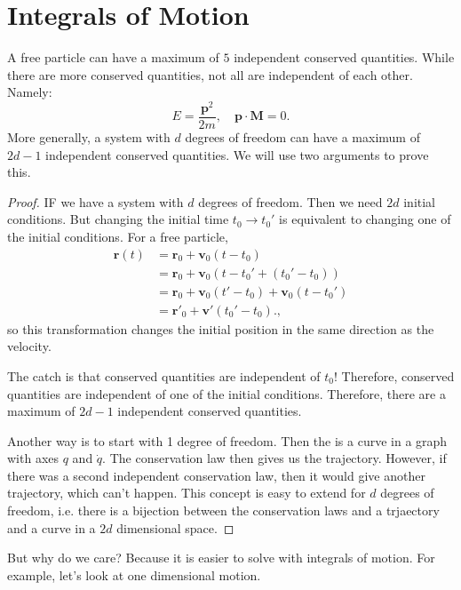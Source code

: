 \documentclass{article}
\numberwithin{equation}{section}
\begin{document}
\section{Integrals of Motion}
A free particle can have a maximum of $5$ independent conserved quantities. While there are more conserved quantities, not all are independent of each other. Namely:
\begin{equation*}
    E = \frac{\bm{p}^2}{2m},\quad \bm{p}\cdot \bm{M} = 0.
\end{equation*}
More generally, a system with $d$ degrees of freedom can have a maximum of $2d-1$ independent conserved quantities. We will use two arguments to prove this.
\begin{proof}
    IF we have a system with $d$ degrees of freedom. Then we need $2d$ initial conditions. But changing the initial time $t_0 \to t_0'$ is equivalent to changing one of the initial conditions. For a free particle,
    \begin{align*}
        \bm{r}(t) &= \bm{r}_0 + \bm{v}_0(t-t_0) \\ 
        &= \bm{r}_0 + \bm{v}_0(t-t_0'+(t_0'-t_0)) \\
        &= \bm{r}_0 + \bm{v}_0(t'-t_0) + \bm{v}_0(t-t_0') \\ 
        &= \bm{r}'_0 + \bm{v}'(t_0'-t_0).,
    \end{align*}
    so this transformation changes the initial position in the same direction as the velocity.

    The catch is that conserved quantities are independent of $t_0$! Therefore, conserved quantities are independent of one of the initial conditions. Therefore, there are a maximum of $2d-1$ independent conserved quantities.

    Another way is to start with 1 degree of freedom. Then the  is a curve in a graph with axes $q$ and $\dot{q}$. The conservation law then gives us the trajectory. However, if there was a second independent conservation law, then it would give another trajectory, which can't happen. This concept is easy to extend for $d$ degrees of freedom, i.e. there is a bijection between the conservation laws and a trjaectory and a curve in a $2d$ dimensional space.
\end{proof} 
But why do we care? Because it is easier to solve with integrals of motion. For example, let's look at one dimensional motion.
\end{document}
